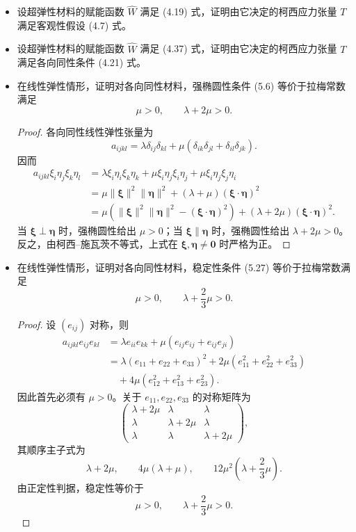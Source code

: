\begin{itemize}
    

    \item[5.]设超弹性材料的赋能函数 $\widehat W$ 满足 (4.19) 式，证明由它决定的柯西应力张量 $T$ 满足客观性假设 (4.7) 式。

    \item[6.]设超弹性材料的赋能函数 $\widehat W$ 满足 (4.37) 式，证明由它决定的柯西应力张量 $T$ 满足各向同性条件 (4.21) 式。

    \item[7.]在线性弹性情形，证明对各向同性材料，强椭圆性条件 (5.6) 等价于拉梅常数满足
    $$
    \mu>0,\qquad \lambda+2\mu>0.
    $$

    \begin{proof}
    各向同性线性弹性张量为
    $$
    a_{ijkl}
    =\lambda\delta_{ij}\delta_{kl}
    +\mu(\delta_{ik}\delta_{jl}+\delta_{il}\delta_{jk}).
    $$
    因而
    $$
    \begin{aligned}
    a_{ijkl}\xi_i\eta_j\xi_k\eta_l
    &=\lambda\xi_i\eta_i\xi_k\eta_k
    +\mu\xi_i\eta_j\xi_i\eta_j
    +\mu\xi_i\eta_j\xi_j\eta_i\\
    &=\mu\|\boldsymbol{\xi}\|^2\|\boldsymbol{\eta}\|^2
    +(\lambda+\mu)
    (\boldsymbol{\xi}\cdot\boldsymbol{\eta})^2\\
    &=\mu\left(
    \|\boldsymbol{\xi}\|^2\|\boldsymbol{\eta}\|^2
    -(\boldsymbol{\xi}\cdot\boldsymbol{\eta})^2
    \right)
    +(\lambda+2\mu)
    (\boldsymbol{\xi}\cdot\boldsymbol{\eta})^2.
    \end{aligned}
    $$
    当 $\boldsymbol{\xi}\perp\boldsymbol{\eta}$ 时，强椭圆性给出
    $\mu>0$；当 $\boldsymbol{\xi}\parallel\boldsymbol{\eta}$ 时，强椭圆性给出
    $\lambda+2\mu>0$。反之，由柯西--施瓦茨不等式，上式在
    $\boldsymbol{\xi},\boldsymbol{\eta}\neq\boldsymbol{0}$ 时严格为正。
    \end{proof}

    \item[8.]在线性弹性情形，证明对各向同性材料，稳定性条件 (5.27) 等价于拉梅常数满足
    $$
    \mu>0,\qquad \lambda+\frac{2}{3}\mu>0.
    $$

    \begin{proof}
    设 $(e_{ij})$ 对称，则
    $$
    \begin{aligned}
    a_{ijkl}e_{ij}e_{kl}
    &=\lambda e_{ii}e_{kk}
    +\mu(e_{ij}e_{ij}+e_{ij}e_{ji})\\
    &=\lambda(e_{11}+e_{22}+e_{33})^2
    +2\mu(e_{11}^2+e_{22}^2+e_{33}^2)\\
    &\quad+4\mu(e_{12}^2+e_{13}^2+e_{23}^2).
    \end{aligned}
    $$
    因此首先必须有 $\mu>0$。关于
    $e_{11},e_{22},e_{33}$ 的对称矩阵为
    $$
    \begin{pmatrix}
    \lambda+2\mu&\lambda&\lambda\\
    \lambda&\lambda+2\mu&\lambda\\
    \lambda&\lambda&\lambda+2\mu
    \end{pmatrix},
    $$
    其顺序主子式为
    $$
    \lambda+2\mu,\qquad
    4\mu(\lambda+\mu),\qquad
    12\mu^2\left(\lambda+\frac{2}{3}\mu\right).
    $$
    由正定性判据，稳定性等价于
    $$
    \mu>0,\qquad
    \lambda+\frac{2}{3}\mu>0.
    $$
    \end{proof}



\end{itemize}
